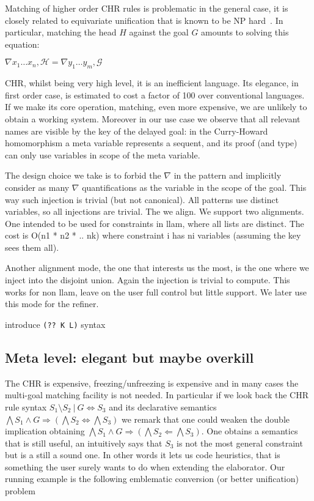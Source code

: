 \documentclass{easychair}
\begin{document}
Matching of higher order CHR rules is problematic in the general case, it is
closely related to equivariate unification that is known to be NP
hard~\cite{Cheney2004}.
In particular, matching the head $H$ against the goal $G$
amounts to solving this equation:

\begin{math}
 \nabla x_1\ldots x_n, \mathcal{H} = \nabla y_1\ldots y_m, \mathcal{G}
\end{math}

CHR, whilst being very high level, it is an inefficient language.
Its elegance, in first order case, is estimated to cost a factor of 100 over
conventional languages.  If we make its core operation, matching, even
more expensive, we are unlikely to obtain a working system.
Moreover in our use case we observe that all relevant names are
visible by the key of the delayed goal: in the Curry-Howard homomorphism 
a meta variable represents a sequent, and its proof (and type) can only
use variables in scope of the meta variable.

The design choice we take is to forbid the $\nabla$ in the pattern
and implicitly consider as many $\nabla$ quantifications as the variable
in the scope of the goal. This way such injection is trivial (but not
canonical).
All patterns use distinct variables, so all injections are trivial.
The we align.  We support two alignments.  One intended to be used 
for constraints in llam, where all lists are distinct.  The cost is O(n1 * n2 * .. nk) where constraint i has ni variables (assuming the key sees them all).

Another alignment mode, the one that interests us the most, is the one where
we inject into the disjoint union.  Again the injection is trivial to compute.
This works for non llam, leave on the user full control but little support.
We later use this mode for the refiner.

introduce \verb+(?? K L)+ syntax

\subsection{Meta level: elegant but maybe overkill}

The CHR is expensive, freezing/unfreezing is expensive and in many cases
the multi-goal matching facility is not needed.  In particular
if we look back the CHR rule syntax
$S_1 \setminus S_2 ~|~ G \iff S_3$ and its
declarative semantics $\bigwedge S_1 \wedge G \Rightarrow (\bigwedge
S_2 \iff \bigwedge S_3)$ we remark that one could
weaken the double implication obtaining
 $\bigwedge S_1 \wedge G \Rightarrow (\bigwedge
S_2 \Leftarrow \bigwedge S_3)$.  One obtains a semantics that
is still useful, an intuitively says that $S_3$ is not the most general
constraint but is a still a sound one.  In other words it lets
us code heuristics, that is something the user surely wants to
do when extending the elaborator.  Our running example
is the following emblematic conversion (or better unification) problem
\end{document}
